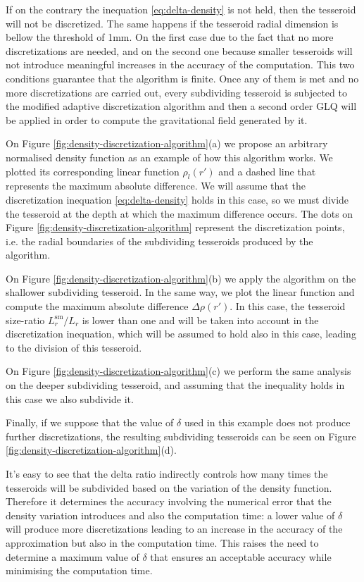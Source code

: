 \documentclass[extra]{gji}
\begin{document}
If on the contrary the inequation \ref{eq:delta-density} is not held, 
then the tesseroid will not be discretized.
The same happens if the tesseroid radial dimension is bellow the 
threshold of 1mm.
On the first case due to the fact that no more discretizations are 
needed, and on the second one because smaller tesseroids will not 
introduce meaningful increases in the accuracy of the computation.
This two conditions guarantee that the algorithm is finite.
Once any of them is met and no more discretizations are carried out, 
every subdividing tesseroid is subjected to the modified adaptive 
discretization algorithm and then a second order GLQ will be applied in 
order to compute the gravitational field generated by it.

On Figure \ref{fig:density-discretization-algorithm}(a) we propose an 
arbitrary normalised density function as an example of how this 
algorithm works.
We plotted its corresponding linear function $\rho_l(r')$ and a 
dashed line that represents the maximum absolute difference.
We will assume that the discretization inequation 
\ref{eq:delta-density} holds in this case, so we must divide the 
tesseroid at the depth at which the maximum difference occurs.
The dots on Figure \ref{fig:density-discretization-algorithm} 
represent the discretization points, i.e. the radial boundaries of the 
subdividing tesseroids produced by the algorithm.

On Figure \ref{fig:density-discretization-algorithm}(b) we apply the 
algorithm on the shallower subdividing tesseroid.
In the same way, we plot the linear function and compute the maximum 
absolute difference $\Delta \rho (r')$.
In this case, the tesseroid size-ratio $L_r^\text{sm}/L_r$ is lower 
than one and will be taken into account in the discretization 
inequation, which will be assumed to hold also in this case, leading to 
the division of this tesseroid.

On Figure \ref{fig:density-discretization-algorithm}(c) we perform the 
same analysis on the deeper subdividing tesseroid, and assuming that the 
inequality holds in this case we also subdivide it.

Finally, if we suppose that the value of $\delta$ used in this example 
does not produce further discretizations, the resulting subdividing 
tesseroids can be seen on Figure 
\ref{fig:density-discretization-algorithm}(d).

It's easy to see that the delta ratio indirectly controls how many 
times the tesseroids will be subdivided based on the variation of the 
density function.
Therefore it determines the accuracy involving the numerical error that 
the density variation introduces and also the computation time: a lower 
value of $\delta$ will produce more discretizations leading to an 
increase in the accuracy of the approximation but also in the 
computation time.
This raises the need to determine a maximum value of $\delta$ that 
ensures an acceptable accuracy while minimising the computation time.
\end{document}
